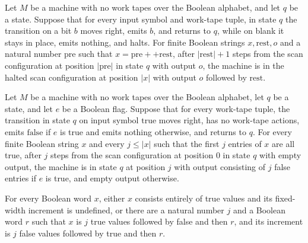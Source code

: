 \begin{lemma}
\label{Turing.FinTM.scanCopy_suffix}
\leanok
{}
Let $M$ be a machine with no work tapes over the Boolean alphabet, and let $q$ be a
state. Suppose that for every input symbol and work-tape tuple, in state $q$ the
transition on a bit $b$ moves right, emits $b$, and returns to $q$, while on blank it
stays in place, emits nothing, and halts. For finite Boolean strings $x,\mathrm{rest},o$
and a natural number $\mathrm{pre}$ such that $x=\mathrm{pre}++\mathrm{rest}$, after
$|\mathrm{rest}|+1$ steps from the scan configuration at position $|\mathrm{pre}|$ in
state $q$ with output $o$, the machine is in the halted scan configuration at position
$|x|$ with output $o$ followed by $\mathrm{rest}$.
\end{lemma}

\begin{lemma}
\label{Turing.FinTM.scanTrues_run}
\leanok
{}
Let $M$ be a machine with no work tapes over the Boolean alphabet, let $q$ be a state,
and let $e$ be a Boolean flag. Suppose that for every work-tape tuple, the transition in
state $q$ on input symbol $\mathrm{true}$ moves right, has no work-tape actions, emits
$\mathrm{false}$ if $e$ is true and emits nothing otherwise, and returns to $q$. For
every finite Boolean string $x$ and every $j\le |x|$ such that the first $j$ entries of
$x$ are all true, after $j$ steps from the scan configuration at position $0$ in state
$q$ with empty output, the machine is in state $q$ at position $j$ with output
consisting of $j$ false entries if $e$ is true, and empty output otherwise.
\end{lemma}

\begin{lemma}
\label{Turing.FinTM.incFixed_cases}
\leanok
{}
For every Boolean word $x$, either $x$ consists entirely of true values and its
fixed-width increment is undefined, or there are a natural number $j$ and a Boolean word
$r$ such that $x$ is $j$ true values followed by false and then $r$, and its increment
is $j$ false values followed by true and then $r$.
\end{lemma}

